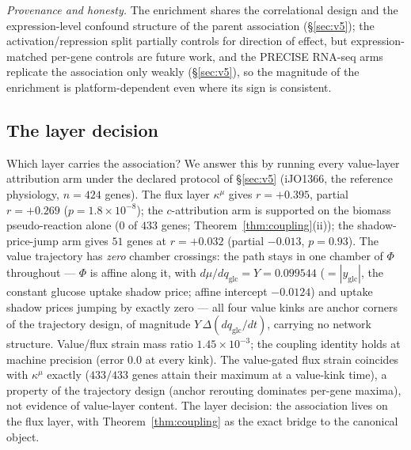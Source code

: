 \documentclass[11pt,a4paper]{article}
\theoremstyle{plain}
\theoremstyle{definition}
\theoremstyle{remark}
\newcommand{\kmu}{\kappa^{\mu}}
\begin{document}
\emph{Provenance and honesty.} The enrichment shares the
correlational design and the expression-level confound structure
of the parent association (\S\ref{sec:v5}); the
activation/repression split partially controls for direction of
effect, but expression-matched per-gene controls are future work,
and the PRECISE RNA-seq arms replicate the association only weakly
(\S\ref{sec:v5}), so the magnitude of the enrichment is
platform-dependent even where its sign is consistent.
\subsection{The layer decision}
\label{sec:v6}
Which layer carries the association? We answer this by running every
value-layer attribution arm under the declared protocol of \S\ref{sec:v5}
(iJO1366, the reference physiology, $n = 424$ genes). The flux layer
$\kmu$ gives $r = +0.395$,
partial $r = +0.269$ ($p = 1.8 \times 10^{-8}$); the $c$-attribution
arm is supported on the biomass pseudo-reaction alone ($0$ of $433$
genes; Theorem~\ref{thm:coupling}(ii)); the shadow-price-jump arm
gives $51$ genes at $r = +0.032$ (partial $-0.013$, $p = 0.93$). The
value trajectory has \emph{zero} chamber crossings: the path stays in
one chamber of $\Phi$ throughout --- $\Phi$ is affine along it, with
$d\mu/dq_{\mathrm{glc}} = Y = 0.099544$ ($= |y_{\mathrm{glc}}|$, the
constant glucose uptake shadow price; affine intercept $-0.0124$) and
uptake shadow prices jumping by exactly zero --- all four value kinks
are anchor corners of the trajectory design, of magnitude
$Y\,\Delta(dq_{\mathrm{glc}}/dt)$, carrying no network structure. Value/flux strain mass ratio
$1.45 \times 10^{-3}$; the coupling identity holds at machine
precision (error $0.0$ at every kink). The value-gated flux strain
coincides with $\kmu$ exactly ($433/433$ genes attain their maximum
at a value-kink time), a property of the trajectory design (anchor
rerouting dominates per-gene maxima), not evidence of value-layer
content. The layer decision: the association lives on the flux layer,
with Theorem~\ref{thm:coupling} as the exact bridge to the canonical
object.
\end{document}
